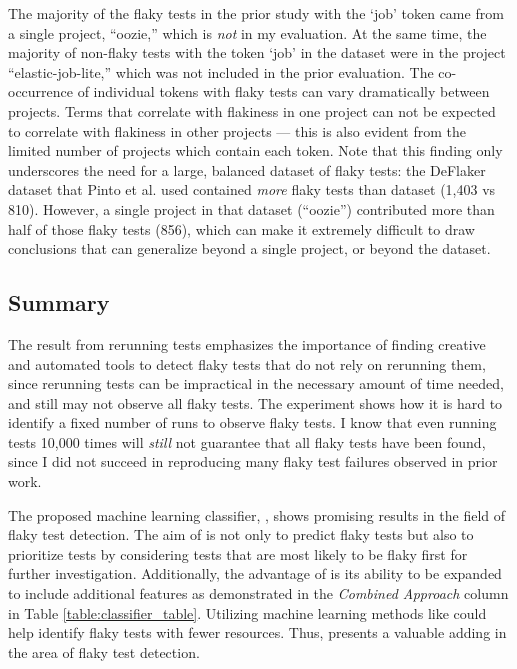 The majority of the flaky tests in the prior study with the `job' token came from a single project, ``oozie,'' which is \emph{not} in my evaluation. At the same time, the majority of non-flaky tests with the token `job' in the dataset were in the project ``elastic-job-lite,'' which was not included in the prior evaluation.
The co-occurrence of individual tokens with flaky tests can vary dramatically between projects. Terms that correlate with flakiness in one project can not be expected to correlate with flakiness in other projects --- this is also evident from the limited number of projects which contain each token. Note that this finding only underscores the need for a large, balanced dataset of flaky tests: the DeFlaker dataset that Pinto et al. used contained \emph{more} flaky tests than \sysName dataset (1,403 vs 810). However, a single project in that dataset (``oozie'') contributed more than half of those flaky tests (856), which can make it extremely difficult to draw conclusions that can generalize beyond a single project, or beyond the dataset.


\subsection{Summary}

The result from rerunning tests emphasizes the importance of finding creative and automated tools to detect flaky tests that do not rely on rerunning them, since rerunning tests can be impractical in the necessary amount of time needed, and still may not observe all flaky tests. The experiment shows how it is hard to identify a fixed number of runs to observe flaky tests. I know that even running tests 10,000 times will \emph{still} not guarantee that all flaky tests have been found, since I did not succeed in reproducing many flaky test failures observed in prior work.


The proposed machine learning classifier, \sysName, shows promising results in the field of flaky test detection. The aim of \sysName is not only to predict flaky tests but also to prioritize tests by considering tests that are most likely to be flaky first for further investigation. Additionally, the advantage of \sysName is its ability to be expanded to include additional features as demonstrated in the \emph{Combined Approach} column in Table \ref{table:classifier_table}. Utilizing machine learning methods like \sysName could help identify flaky tests with fewer resources. Thus, \sysName presents a valuable adding in the area of flaky test detection.